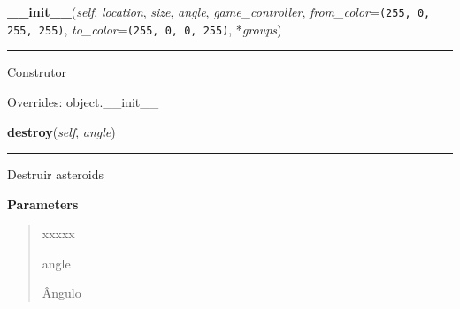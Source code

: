 \hspace{.8\funcindent}\begin{boxedminipage}{\funcwidth}

    \raggedright \textbf{\_\_init\_\_}(\textit{self}, \textit{location}, \textit{size}, \textit{angle}, \textit{game\_controller}, \textit{from\_color}={\tt \texttt{(}255\texttt{, }0\texttt{, }255\texttt{, }255\texttt{)}}, \textit{to\_color}={\tt \texttt{(}255\texttt{, }0\texttt{, }0\texttt{, }255\texttt{)}}, *\textit{groups})

    \vspace{-1.5ex}

    \rule{\textwidth}{0.5\fboxrule}
\setlength{\parskip}{2ex}
    Construtor

\setlength{\parskip}{1ex}
      Overrides: object.\_\_init\_\_

    \end{boxedminipage}

    \label{pygame-asteroids:asteroid:Asteroid:destroy}

    \vspace{0.5ex}

\hspace{.8\funcindent}\begin{boxedminipage}{\funcwidth}

    \raggedright \textbf{destroy}(\textit{self}, \textit{angle})

    \vspace{-1.5ex}

    \rule{\textwidth}{0.5\fboxrule}
\setlength{\parskip}{2ex}
    Destruir asteroids

\setlength{\parskip}{1ex}
      \textbf{Parameters}
      \vspace{-1ex}

      \begin{quote}
        \begin{Ventry}{xxxxx}

          \item[angle]

          Ângulo

        \end{Ventry}

      \end{quote}

    \end{boxedminipage}

